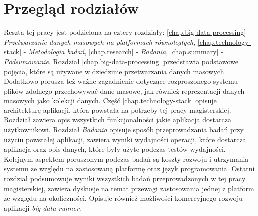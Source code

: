 \section{Przegląd rodziałów}
Reszta tej pracy jest podzielona na cztery rozdziały: \ref{chap.big-data-processing} - \textit{Przetwarzanie danych masowych na platformach równoległych}, \ref{chap.technology-stack} - \textit{Metodologia badań}, \ref{chap.research} - \textit{Badania}, \ref{chap.summary} - \textit{Podsumowanie}. Rozdział \ref{chap.big-data-processing} przedstawia podstawowe pojęcia, które są używane w dziedzinie przetwarzania danych masowych. Dodatkowo porusza też ważne zagadnienie dotyczące rozproszonego systemu plików zdolnego przechowywać dane masowe, jak również reprezentacji danych masowych jako kolekcji danych. Część \ref{chap.technology-stack} opisuje architekturę aplikacji, która powstała na potrzeby tej pracy magisterskiej. Rozdział zawiera opis wszystkich funkcjonalności jakie aplikacja dostarcza użytkownikowi. Rozdział \textit{Badania} opisuje sposób przeprowadzania badań przy użyciu powstałej aplikacji, zawiera wyniki wydajności operacji, które dostarcza aplikacja oraz opis danych, które były użyte podczas testów wydajności. Kolejnym aspektem poruszonym podczas badań są koszty rozwoju i utrzymania systemu ze względu na zastosowaną platformę oraz język programowania. Ostatni rozdział podsumowuje wyniki wszystkich badań przeprowadzonych w tej pracy magisterskiej, zawiera dyskusje na temat przewagi zastosowania jednej z platform ze względu na okoliczności. Opisuje również możliwości komercyjnego rozwoju aplikacji \textit{big-data-runner}.